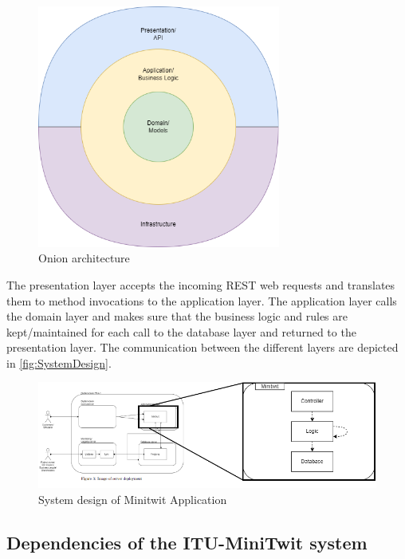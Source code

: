 \begin{figure}[!ht]
    \centering
    \includegraphics[width=80mm]{images/diagrams/ApplicationOverview.png}
    \captionsetup{justification=centering,margin=1cm}
    \caption{Onion architecture}
    \label{fig:onion_architecture}
\end{figure}


The presentation layer accepts the incoming REST web requests and translates them to method invocations to the application layer. The application layer calls the domain layer and makes sure that the business logic and rules are kept/maintained for each call to the database layer and returned to the presentation layer. The communication between the different layers are depicted in \autoref{fig:SystemDesign}.

\begin{figure}[!ht]
    \centering
    \captionsetup{justification=centering,margin=1cm}
    \includegraphics[width=\linewidth]{images/diagrams/system-design-version2.drawio.png}
    \caption{System design of Minitwit Application}
    \label{fig:SystemDesign}
\end{figure}


\subsection{Dependencies of the ITU-MiniTwit system}

